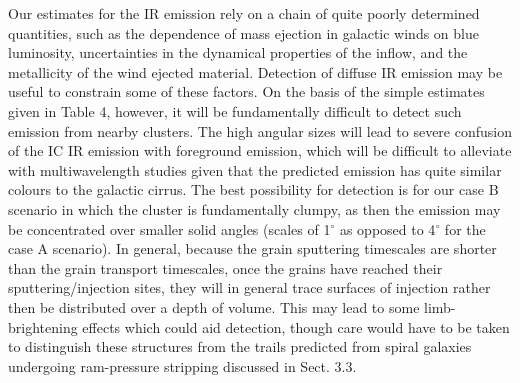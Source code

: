 \documentclass[]{aa}
\begin{document}
Our estimates for the IR emission rely on a chain of quite poorly
determined quantities, such as the dependence of mass ejection in galactic 
winds on blue luminosity, uncertainties in the dynamical properties of the 
inflow, and the metallicity of the wind ejected material. Detection of diffuse
IR emission may be useful to constrain some of these factors. On the basis of
the simple estimates given in Table 4, however, it will be fundamentally
difficult to detect such emission from nearby clusters. The high angular sizes
will lead to severe confusion of the IC IR emission with foreground emission, 
which will be difficult to alleviate with multiwavelength studies given that 
the predicted emission has quite similar colours to the galactic cirrus. 
The best possibility for detection is for our case B scenario in which the 
cluster
is fundamentally clumpy, as then the emission may be concentrated over 
smaller solid angles (scales of 1$^{\circ}$ as opposed to 4$^{\circ}$ 
for the case A scenario). In general, because the grain sputtering timescales 
are shorter than the grain transport timescales, once the grains have 
reached their sputtering/injection sites, they will in general trace 
surfaces of injection rather then be distributed over a depth of volume.
This may lead to some limb-brightening effects which could aid detection,
though care would have to be taken to distinguish these structures from the
trails predicted from spiral galaxies undergoing ram-pressure stripping
discussed in Sect. 3.3.
\end{document}
